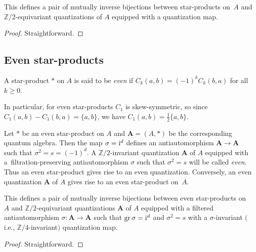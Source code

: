 \begin{Proposition} This defines a pair of mutually inverse bijections between star-products on~$A$ and ${\mathbb Z}/2$-equivariant quantizations of $A$ equipped with a quantization map.
\end{Proposition}

\begin{proof} Straightforward.
\end{proof}

\subsection{Even star-products}

\begin{Definition} A star-product $*$ on $A$ is said to be {\it even} if $C_k(a,b)=(-1)^k C_k(b,a)$ for all $k\ge 0$.
\end{Definition}

In particular, for even star-products $C_1$ is skew-symmetric, so since $C_1(a,b)-C_1(b,a)=\lbrace a,b\rbrace$, we have $C_1(a,b)=\frac{1}{2}\lbrace a,b\rbrace$.

Let $*$ be an even star-product on $A$ and ${{\mathbf A}}=(A,*)$ be the corresponding quantum algebra.
Then the map $\sigma={\rm i}^d$ defines an antiautomorphism ${{\mathbf A}}\to {{\mathbf A}}$ such that $\sigma^2=s=(-1)^d$. A ${\mathbb Z}/2$-invariant quantization ${\mathbf A}$ of $A$ equipped with a~filtration-preserving antiautomorphism $\sigma$ such that $\sigma^2=s$ will be called {\it even}. Thus an even star-product gives rise to an even quantization. Conversely, an even quantization ${{\mathbf A}}$ of $A$ gives rise to an even star-product on~$A$.

\begin{Proposition} This defines a pair of mutually inverse bijections between even star-products on $A$ and ${\mathbb Z}/2$-equivariant quantizations ${{\mathbf A}}$ of $A$ equipped with a filtered antiautomorphism $\sigma\colon {{\mathbf A}}\to {{\mathbf A}}$ such that $\operatorname{gr}\sigma={\rm i}^d$ and $\sigma^2=s$ with a $\sigma$-invariant $($i.e., ${\mathbb Z}/4$-invariant$)$ quantization map.
\end{Proposition}

\begin{proof} Straightforward.
\end{proof}
